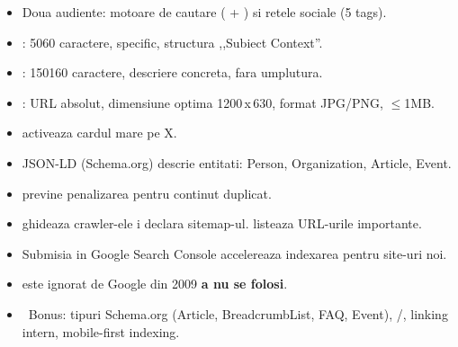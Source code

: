 \begin{recap}
\begin{itemize}[itemsep=1pt]
  \item Doua audiente: motoare de cautare ( + ) si retele sociale (5  tags).
  \item {}: 50\textendash{}60 caractere, specific, structura ,,Subiect \textendash{} Context''.
  \item {}: 150\textendash{}160 caractere, descriere concreta, fara umplutura.
  \item {}: URL absolut, dimensiune optima 1200\,x\,630, format JPG/PNG, $\leq$1MB.
  \item {} activeaza cardul mare pe X.
  \item JSON-LD (Schema.org) descrie entitati: Person, Organization, Article, Event.
  \item {} previne penalizarea pentru continut duplicat.
  \item {} ghideaza crawler-ele i declara sitemap-ul.  listeaza URL-urile importante.
  \item Submisia in Google Search Console accelereaza indexarea pentru site-uri noi.
  \item {} este ignorat de Google din 2009 \textendash{} \textbf{a nu se folosi}.
  \item \faRocket\ Bonus: tipuri Schema.org (Article, BreadcrumbList, FAQ, Event), /, linking intern, mobile-first indexing.
\end{itemize}
\end{recap}

\partdivider

